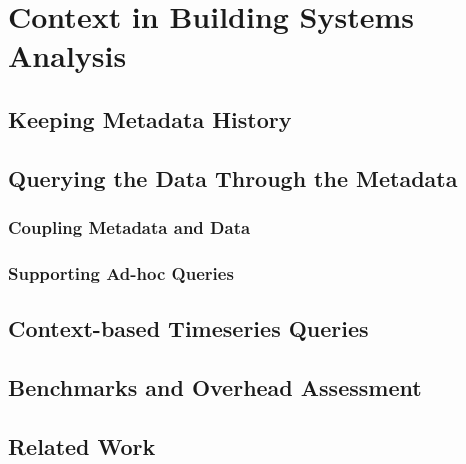 \chapter{Context in Building Systems Analysis}

\section{Keeping Metadata History}

\section{Querying the Data Through the Metadata}
\subsection{Coupling Metadata and Data}
\subsection{Supporting Ad-hoc Queries}


\section{Context-based Timeseries Queries}

\section{Benchmarks and Overhead Assessment}

\section{Related Work}